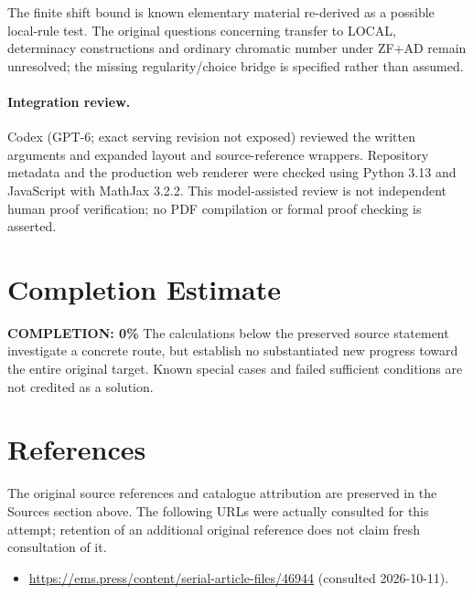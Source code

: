 \documentclass[11pt]{article}
\begin{document}
The finite shift bound is known elementary material re-derived as a possible
local-rule test. The original questions concerning transfer to LOCAL,
determinacy constructions and ordinary chromatic number under ZF+AD remain
unresolved; the missing regularity/choice bridge is specified rather than assumed.

\paragraph{Integration review.} Codex (GPT-6; exact serving revision not exposed) reviewed the written arguments and expanded layout and source-reference wrappers. Repository metadata and the production web renderer were checked using Python 3.13 and JavaScript with MathJax 3.2.2. This model-assisted review is not independent human proof verification; no PDF compilation or formal proof checking is asserted.

\section{Completion Estimate}
\noindent\textbf{COMPLETION: 0\%}
The calculations below the preserved source statement investigate a concrete route,
but establish no substantiated new progress toward the entire original target.
Known special cases and failed sufficient conditions are not credited as a solution.
\section{References}
The original source references and catalogue attribution are preserved in the
Sources section above. The following URLs were actually consulted for this attempt;
retention of an additional original reference does not claim fresh consultation of it.
\begin{itemize}
\item \url{https://ems.press/content/serial-article-files/46944} (consulted 2026-10-11). 
\end{itemize}
\end{document}
